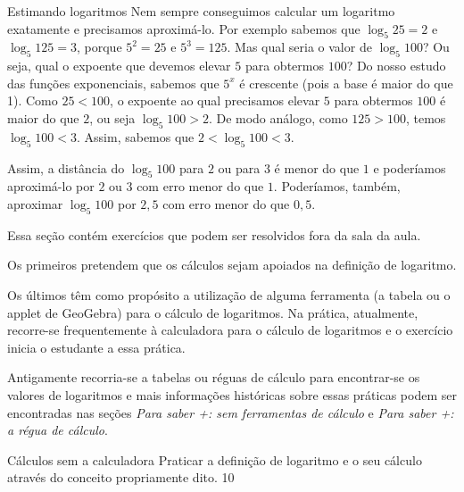 \begin{example}{Estimando logaritmos}
Nem sempre conseguimos calcular um logaritmo exatamente e precisamos aproximá-lo. Por exemplo sabemos que $\log_5 25 = 2$ e $\log_5 125 = 3$, porque $5^2=25$ e $5^3 = 125$. Mas qual seria o valor de $\log_5 100$? Ou seja, qual o expoente que devemos elevar $5$ para obtermos $100$? Do nosso estudo das funções exponenciais, sabemos que $5^x$ é crescente (pois a base é maior do que 1). Como $25 < 100$, o expoente ao qual precisamos elevar $5$ para obtermos $100$ é maior do que $2$, ou seja $\log_5 100 >2$. De modo análogo, como $125 > 100$, temos $\log_5 100<3$. Assim, sabemos que $2<\log_5 100<3$.

\begin{figure}[H]
\centering

\end{figure}

Assim, a distância do $\log_5 100$ para $2$ ou para $3$ é menor do que $1$ e poderíamos aproximá-lo por $2$ ou $3$ com erro menor do que $1$. Poderíamos, também, aproximar $\log_5 100$ por $2{,}5$ com erro menor do que $0{,}5$. 
\end{example}


\def\currentcolor{session2}
\begin{texto}
{

Essa seção contém exercícios que podem ser resolvidos fora da sala da aula.

Os primeiros pretendem que os cálculos sejam apoiados na definição de logaritmo.

Os últimos têm como propósito a utilização de alguma ferramenta (a tabela ou o applet de GeoGebra) para o cálculo de logaritmos. Na prática, atualmente, recorre-se frequentemente à calculadora para o cálculo de logaritmos e o exercício inicia o estudante a essa prática.

Antigamente recorria-se a tabelas ou réguas de cálculo para encontrar-se os valores de logaritmos e mais informações históricas sobre essas práticas podem ser encontradas nas seções \textit{Para saber +: sem ferramentas de cálculo} e \textit{Para saber +: a régua de cálculo}.
}
\end{texto}
\begin{objectives}{Cálculos sem a calculadora}
{
Praticar a definição de logaritmo e o seu cálculo através do conceito propriamente dito.
}{1}{0}
\end{objectives}

